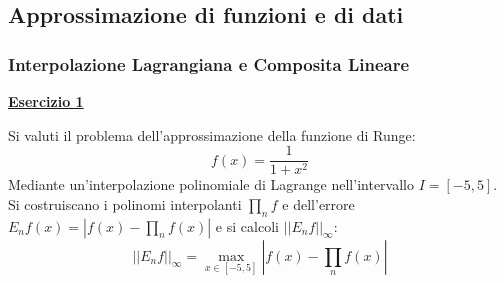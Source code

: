 \subsection{Approssimazione di funzioni e di dati}

\subsubsection{Interpolazione Lagrangiana e Composita Lineare}

\begin{flushleft}
	\textbf{\underline{Esercizio 1}}
\end{flushleft}
Si valuti il problema dell'approssimazione della funzione di Runge:
\begin{equation*}
	f\left(x\right) = \dfrac{1}{1+x^{2}}
\end{equation*}
Mediante un'interpolazione polinomiale di Lagrange nell'intervallo $I = \left[-5, 5\right]$. Si costruiscano i polinomi interpolanti $\prod_{n}f$ e dell'errore $E_{n}f\left(x\right) = \left|f\left(x\right) - \prod_{n}f\left(x\right)\right|$ e si calcoli $\left|\left|E_{n}f\right|\right|_{\infty}$:
\begin{equation*}
	\left|\left|E_{n}f\right|\right|_{\infty} = \underset{x \in \left[-5, 5\right]}{\max} \left|f\left(x\right) - \prod_{n}f\left(x\right)\right|
\end{equation*}

